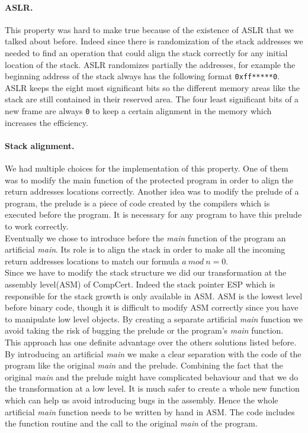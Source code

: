 \documentclass[11pt]{sdm}
\begin{document}
\paragraph{ASLR.}
\label{par:ASLR}

This property was hard to make true because of the existence of ASLR that we talked about before. Indeed since there is randomization of the stack addresses we needed to find an operation that could align the stack correctly for any initial location of the stack. ASLR randomizes partially the addresses, for example the beginning address of the stack always has the following format \texttt{0xff*****0}. 
ASLR keeps the eight most significant bits so the different memory areas like the stack are still contained in their reserved area. The four least significant bits of a new frame are always \texttt{0} to keep a certain alignment in the memory which increases the efficiency.
\hfill \break

\paragraph{Stack alignment.}
\label{par:Stack alignment}

We had multiple choices for the implementation of this property. One of them was to modify the main function of the protected program in order to align the return addresses locations correctly. Another idea was to modify the prelude of a program, the prelude is a piece of code created by the compilers which is executed before the program. It is necessary for any program to have this prelude to work correctly. \\
Eventually we chose to introduce before the \textit{main} function of the program an artificial \textit{main}. Its role is to align the stack in order to make all the incoming return addresses locations to match our formula $a~mod~n=0$. \\
Since we have to modify the stack structure we did our transformation at the assembly level(ASM) of CompCert. Indeed the stack pointer ESP which is responsible for the stack growth is only available in ASM. ASM is the lowest level before binary code, though it is difficult to modify ASM correctly since you have to manipulate low level objects. 
By creating a separate artificial \textit{main} function we avoid taking the risk of bugging the prelude or the program's \textit{main} function.\\
This approach has one definite advantage over the others solutions listed before. 
By introducing an artificial \textit{main} we make a clear separation with the code of the program like the original \textit{main} and the prelude. Combining the fact that the original \textit{main} and the prelude might have complicated behaviour and that we do the transformation at a low level.
It is much safer to create a whole new function which can help us avoid introducing bugs in the assembly. Hence the whole artificial \textit{main} function needs to be written by hand in ASM. The code includes the function routine and the call to the original \textit{main} of the program.
\end{document}
